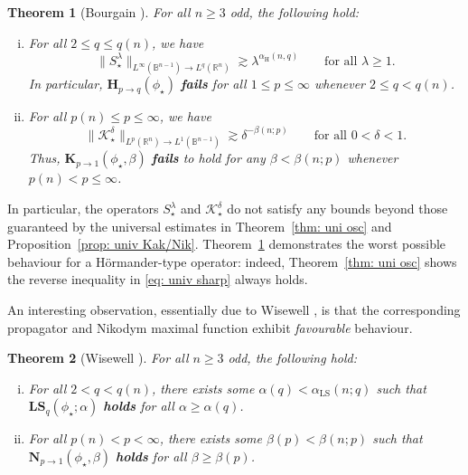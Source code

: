 \documentclass[reqno]{amsart}
\numberwithin{equation}{section}
\newcommand{\B}{\mathbb{B}}
\newcommand{\R}{\mathbb{R}}
\newcommand{\cK}{\mathcal{K}}
\newcommand{\bH}{\mathbf{H}}
\newcommand{\bK}{\mathbf{K}}
\newcommand{\bN}{\mathbf{N}}
\newcommand{\bLS}{\mathbf{LS}}
\theoremstyle{plain}
\newtheorem{theorem}{Theorem}[section]
\theoremstyle{definition}
\begin{document}
\begin{theorem}[Bourgain \cite{Bourgain1991}]\label{thm: univ sharp} For all $n \geq 3$ odd, the following hold:
\begin{enumerate}[i)]
    \item For all $2 \leq q \leq q(n)$, we have 
\begin{equation}\label{eq: univ sharp}
\|S_{\star}^{\lambda}\|_{L^{\infty}(\B^{n-1}) \to L^q(\R^n)} \gtrsim \lambda^{\alpha_{\mathrm{H}}(n,q)} \qquad \textrm{for all $\lambda \geq 1$.}
\end{equation}
In particular, $\bH_{p \to q}(\phi_{\star})$ \textbf{fails} for all $1 \leq p \leq \infty$ whenever $2 \leq q < q(n)$.
    \item For all $p(n) \leq p \leq \infty$, we have
\begin{equation*}
    \|\cK^{\delta}_{\star}\|_{L^p(\R^n) \to L^1(\B^{n-1})} \gtrsim \delta^{-\beta(n; p)} \qquad \textrm{for all $0 < \delta < 1$.}
\end{equation*}
Thus, $\bK_{p \to 1}(\phi_{\star}, \beta)$ \textbf{fails} to hold for any $\beta < \beta(n; p)$ whenever $p(n) < p \leq \infty$. 
\end{enumerate}
\end{theorem}

In particular, the operators $S_{\star}^{\lambda}$ and $\cK^{\delta}_{\star}$ do not satisfy any bounds beyond those guaranteed by the universal estimates in Theorem~\ref{thm: uni osc} and Proposition~\ref{prop: univ Kak/Nik}. Theorem~\ref{thm: univ sharp} demonstrates the worst possible behaviour for a H\"ormander-type operator: indeed, Theorem~\ref{thm: uni osc} shows the reverse inequality in \eqref{eq: univ sharp} always holds.

An interesting observation, essentially due to Wisewell \cite{Wisewell2005}, is that the corresponding propagator and Nikodym maximal function exhibit \textit{favourable} behaviour. 

\begin{theorem}[Wisewell \cite{Wisewell2005}]\label{thm: Wisewell} For all $n \geq 3$ odd, the following hold:
\begin{enumerate}[i)]
    \item For all $2 < q < q(n)$, there exists some $\alpha(q) < \alpha_{\mathrm{LS}}(n; q)$ such that $\bLS_q(\phi_{\star}; \alpha)$ \textbf{holds} for all $\alpha \geq \alpha(q)$.
    \item For all $p(n) < p < \infty$, there exists some $\beta(p) < \beta(n;p)$ such that $\bN_{p \to 1}(\phi_{\star}, \beta)$ \textbf{holds} for all $\beta \geq \beta(p)$.
\end{enumerate}
\end{theorem}
\end{document}
